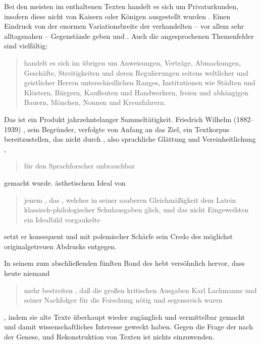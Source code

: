 %
Bei den meisten im \CAO{} enthaltenen Texten handelt es sich um
Privaturkunden, insofern diese nicht von Kaisern oder Königen
ausgestellt wurden \autocites[vgl.][575]{frenz1998a}[585]{frenz1998b}. Einen
Eindruck von der enormen Variationsbreite der verhandelten -- vor allem sehr
alltagsnahen -- Gegen\-stände geben \citet[11]{schulze2011} und
\citet[35--36]{ganslmayer2012}. Auch die angesprochenen Themenfelder sind
vielfältig: \blockcquote[596]{schmidtwiegand1998b}{ handelt es sich
im übrigen um Anweisungen, Verträge, Abmachungen, Geschäfte, Streitigkeiten und
deren Regulierungen seitens weltlicher und geistlicher Herren unterschiedlichen
Ranges, Institutionen wie Städten und Klöstern, Bürgern, Kaufleuten und
Handwerkern, freien und abhängigen Bauern, Mönchen, Nonnen und Kreuzfahrern.}

Das \CAO{} ist ein Produkt jahrzehntelanger Sammeltätigkeit. Friedrich
Wilhelm\nocite{wilhelm1932} (1882--1939)%
, sein Begründer, verfolgte von Anfang an das Ziel, ein Textkorpus
bereitzustellen, das nicht durch , also sprachliche
Glättung und Vereinheitlichung \autocites[vgl.][76--84]{bein2011}{kragl2015},
\blockcquote[\RN{60}]{wilhelm1932}{für den Sprachforscher unbrauchbar} gemacht
wurde.  ästhetischem Ideal von
\blockcquote[\RN{3}]{wilhelm1932}{jenem , das
 \textelp{}, welches in seiner
sauberen Gleichmäßigkeit dem Latein klassisch-philo\-logi\-scher Schulausgaben
glich, und das \textelp{} nicht Eingeweihten ein Idealbild vorgaukelte} setzt
er konsequent und mit polemischer Schärfe sein Credo des möglichst
originalgetreuen Abdrucks entgegen.

In seinem  zum abschließenden fünften Band des
\CAO{} hebt \citeauthor{deboor1976} versöhnlich hervor, dass heute
niemand \blockcquote[\RN{13}]{deboor1976}{mehr bestreiten , daß
die großen kritischen Ausgaben Karl Lachmanns und seiner
Nachfolger für die Forschung nötig und segensreich waren}, indem sie alte Texte
überhaupt wieder zugänglich und vermittelbar gemacht und damit
wissenschaftliches Interesse geweckt haben. Gegen die Frage der
 nach der Genese,  und
Rekonstruktion von Texten ist nichts einzuwenden.

